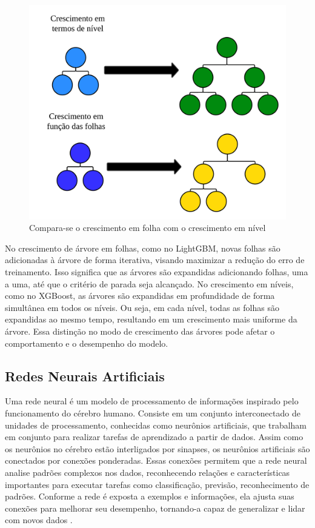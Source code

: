 \begin{figure}[!htb]
	\centering
	\caption{Compara-se o crescimento em folha com o crescimento em nível}
	\label{fig:xgboost}
	\includegraphics[width=0.7\linewidth]{Modelos/Figuras/xgboost}
	
\end{figure}


No crescimento de árvore em folhas, como no LightGBM, novas folhas são adicionadas à árvore de forma iterativa, visando maximizar a redução do erro de treinamento. Isso significa que as árvores são expandidas adicionando folhas, uma a uma, até que o critério de parada seja alcançado.
No crescimento em níveis, como no XGBoost, as árvores são expandidas em profundidade de forma simultânea em todos os níveis. Ou seja, em cada nível, todas as folhas são expandidas ao mesmo tempo, resultando em um crescimento mais uniforme da árvore.
Essa distinção no modo de crescimento das árvores pode afetar o comportamento e o desempenho do modelo. 


\subsection{Redes Neurais Artificiais}

Uma rede neural é um modelo de processamento de informações inspirado pelo funcionamento do cérebro humano. Consiste em um conjunto interconectado de unidades de processamento, conhecidas como neurônios artificiais, que trabalham em conjunto para realizar tarefas de aprendizado a partir de dados. Assim como os neurônios no cérebro estão interligados por sinapses, os neurônios artificiais são conectados por conexões ponderadas. Essas conexões permitem que a rede neural analise padrões complexos nos dados, reconhecendo relações e características importantes para executar tarefas como classificação, previsão, reconhecimento de padrões. Conforme a rede é exposta a exemplos e informações, ela ajusta suas conexões para melhorar seu desempenho, tornando-a capaz de generalizar e lidar com novos dados \cite{silva2003redes}.

